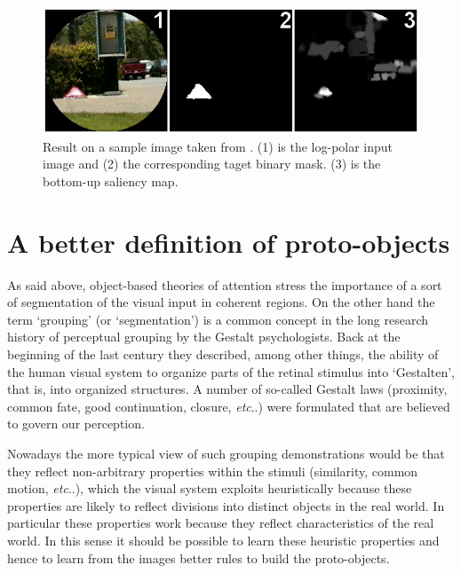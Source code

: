 \documentclass{llncs}
\makeatletter
\DeclareRobustCommand\onedot{\futurelet\@let@token\@onedot}
\def\@onedot{\ifx\@let@token.\else.\null\fi\xspace}
\def\etc{\emph{etc}\onedot} \def\vs{\emph{vs}\onedot}
\makeatother
\begin{document}
\begin{figure}[!h]
  \begin{center}
    \includegraphics[width=0.9\linewidth]{./figs/attention/itti}
    \caption{Result on a sample image taken from \cite{IttiK01b}.
     (1) is the log-polar input image and (2) the corresponding taget binary mask.
     (3) is the bottom-up saliency map.}
    \label{fig:itti_ex}
  \end{center}
\end{figure}


\section{A better definition of proto-objects}
\label{sec:ass_fields}


As said above, object-based theories of attention stress the importance
of a sort of segmentation of the visual input in coherent regions.
On the other hand the term `grouping' (or `segmentation')
is a common concept in the long research history of perceptual grouping
by the Gestalt psychologists.
Back at the beginning of the last century they
described, among other things, the ability of the human
visual system to organize parts of the retinal stimulus
into `Gestalten', that is, into organized structures.
A number of so-called Gestalt laws 
(proximity, common fate, good continuation, closure, \etc) were
formulated that are believed to govern our perception.

Nowadays the more typical view of such grouping
demonstrations would be that they reflect non-arbitrary properties within the stimuli
(similarity, common motion, \etc), which the visual system
exploits heuristically because these properties
are likely to reflect divisions into distinct objects in the real world.
In particular these properties work because they reflect characteristics of
the real world. 
In this sense it should be possible to learn these heuristic
properties and hence to learn from the images better rules
to build the proto-objects.
\end{document}
